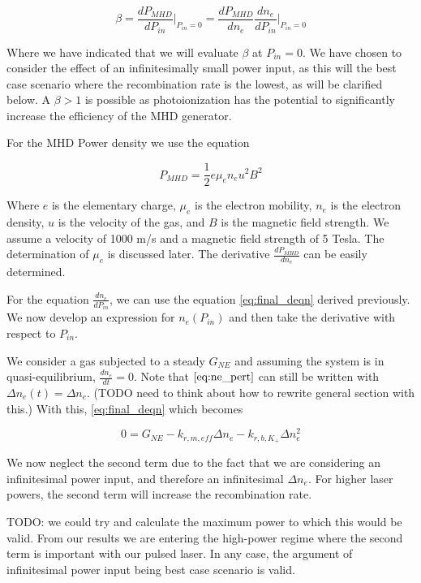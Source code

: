 \begin{equation}
  \label{eq:beta_def}
\beta = \frac{dP_{MHD}}{dP_{in}} \Big|_{P_{in}=0} = \frac{dP_{MHD}}{dn_{e}}\frac{dn_{e}}{dP_{in}}\Big|_{P_{in}=0}
\end{equation}

Where we have indicated that we will evaluate $\beta$ at $P_{in} = 0$. We have chosen to consider the effect of an infinitesimally small power input, as this will the best case scenario where the recombination rate is the lowest, as will be clarified below. A $\beta > 1$ is possible as photoionization has the potential to significantly increase the efficiency of the MHD generator. 

For the MHD Power density we use the equation

\begin{equation}
  \label{eq:mhd_power}
P_{MHD} = \frac{1}{2} e \mu_e n_e u^2 B^2
\end{equation}

Where $e$ is the elementary charge, $\mu_e$ is the electron mobility, $n_e$ is the electron density, $u$ is the velocity of the gas, and $B$ is the magnetic field strength. We assume a velocity of 1000 m/s and a magnetic field strength of 5 Tesla. The determination of $\mu_e$ is discussed later. The derivative $\frac{dP_{MHD}}{dn_{e}}$ can be easily determined. 

For the equation $\frac{dn_{e}}{dP_{in}}$, we can use the equation \ref{eq:final_deqn} derived previously. We now develop an expression for $n_{e}(P_{in})$ and then take the derivative with respect to $P_{in}$.

We consider a gas subjected to a steady $G_{NE}$ and assuming the system is in quasi-equilibrium, $\frac{dn_{e}}{dt} = 0$. Note that $\ref{eq:ne_pert}$ can still be written with $\Delta n_e(t) = \Delta n_{e}$. (TODO need to think about how to rewrite general section with this.) With this, \ref{eq:final_deqn} which becomes

\begin{equation}
0 = G_{NE} - k_{r, m, eff}\Delta n_{e} - k_{r, b, K_{+}}\Delta n_{e}^2
\end{equation}

We now neglect the second term due to the fact that we are considering an infinitesimal power input, and therefore an infinitesimal $\Delta n_{e}$. For higher laser powers, the second term will increase the recombination rate. 

TODO: we could try and calculate the maximum power to which this would be valid. From our results we are entering the high-power regime where the second term is important with our pulsed laser. In any case, the argument of infinitesimal power input being best case scenario is valid. 

